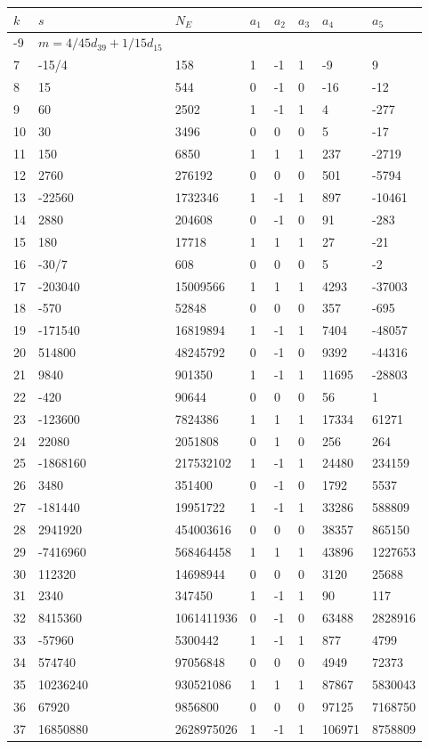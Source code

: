 \documentclass{amsart}
\begin{document}
\begin{longtable}{|l|l|l|lllll|}
\hline
$k$ & $s$ & $N_E$ & $a_1$ & $a_2$ & $a_3$ & $a_4$ & $a_5$\\
\hline
-9&$m=4/45d_{39}+1/15d_{15}$&&\multicolumn{5}{c|}{}\\
7&-15/4&158&1&-1&1&-9&9\\
8&15&544&0&-1&0&-16&-12\\
9&60&2502&1&-1&1&4&-277\\
10&30&3496&0&0&0&5&-17\\
11&150&6850&1&1&1&237&-2719\\
12&2760&276192&0&0&0&501&-5794\\
13&-22560&1732346&1&-1&1&897&-10461\\
14&2880&204608&0&-1&0&91&-283\\
15&180&17718&1&1&1&27&-21\\
16&-30/7&608&0&0&0&5&-2\\
17&-203040&15009566&1&1&1&4293&-37003\\
18&-570&52848&0&0&0&357&-695\\
19&-171540&16819894&1&-1&1&7404&-48057\\
20&514800&48245792&0&-1&0&9392&-44316\\
21&9840&901350&1&-1&1&11695&-28803\\
22&-420&90644&0&0&0&56&1\\
23&-123600&7824386&1&1&1&17334&61271\\
24&22080&2051808&0&1&0&256&264\\
25&-1868160&217532102&1&-1&1&24480&234159\\
26&3480&351400&0&-1&0&1792&5537\\
27&-181440&19951722&1&-1&1&33286&588809\\
28&2941920&454003616&0&0&0&38357&865150\\
29&-7416960&568464458&1&1&1&43896&1227653\\
30&112320&14698944&0&0&0&3120&25688\\
31&2340&347450&1&-1&1&90&117\\
32&8415360&1061411936&0&-1&0&63488&2828916\\
33&-57960&5300442&1&-1&1&877&4799\\
34&574740&97056848&0&0&0&4949&72373\\
35&10236240&930521086&1&1&1&87867&5830043\\
36&67920&9856800&0&0&0&97125&7168750\\
37&16850880&2628975026&1&-1&1&106971&8758809\\

\end{longtable}
\end{document}
